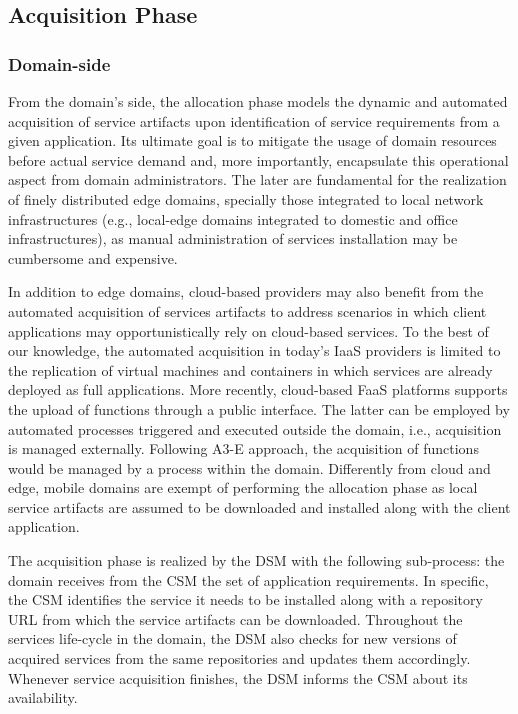 \subsection{Acquisition Phase}\label{sec:A3-E-acquisition}


\subsubsection*{Domain-side} From the domain's side, the allocation phase models the dynamic and automated acquisition of service artifacts upon identification of service requirements from a given application. Its ultimate goal is to mitigate the usage of domain resources before actual service demand and, more importantly, encapsulate this operational aspect from domain administrators. The later are fundamental for the realization of finely distributed edge domains, specially those integrated to local network infrastructures (e.g., local-edge domains integrated to domestic and office infrastructures), as manual administration of services installation may be cumbersome and expensive.

In addition to edge domains, cloud-based providers may also benefit from the automated acquisition of services artifacts to address scenarios in which client applications may opportunistically rely on cloud-based services. To the best of our knowledge, the automated acquisition in today's IaaS providers is limited to the replication of virtual machines and containers in which services are already deployed as full applications. More recently, cloud-based FaaS platforms supports the upload of functions through a public interface. The latter can be employed by automated processes triggered and executed outside the domain, i.e., acquisition is managed externally. Following A3-E approach, the acquisition of functions would be managed by a process within the domain. Differently from cloud and edge, mobile domains are exempt of performing the allocation phase as local service artifacts are assumed to be downloaded and installed along with the client application.

The acquisition phase is realized by the DSM with the following sub-process: the domain receives from the CSM the set of application requirements. In specific, the CSM identifies the service it needs to be installed along with a repository URL from which the service artifacts can be downloaded. Throughout the services life-cycle in the domain, the DSM also checks for new versions of acquired services from the same repositories and updates them accordingly. Whenever service acquisition finishes, the DSM informs the CSM about its availability.

